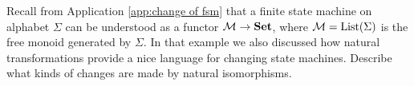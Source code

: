 \documentclass[CT4S-EN-RU]{subfiles}
\begin{document}
\begin{exercise}
Recall from Application \ref{app:change of fsm} that a finite state machine on alphabet $\Sigma$ can be understood as a functor $\mathcal{M}\rightarrow{\bf Set}$, where $\mathcal{M}=\textnormal{List}(\Sigma)$ is the free monoid generated by $\Sigma$. In that example we also discussed how natural transformations provide a nice language for changing state machines. Describe what kinds of changes are made by natural isomorphisms.
\end{exercise}


\subsubsection{}
\end{document}
